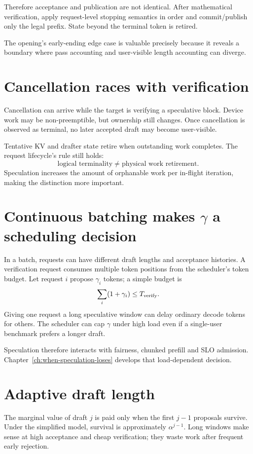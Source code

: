 Therefore acceptance and publication are not identical. After mathematical
verification, apply request-level stopping semantics in order and commit/publish only
the legal prefix. State beyond the terminal token is retired.

The opening's early-ending edge case is valuable precisely because it reveals a
boundary where pass accounting and user-visible length accounting can diverge.

\section{Cancellation races with verification}

Cancellation can arrive while the target is verifying a speculative block. Device
work may be non-preemptible, but ownership still changes. Once cancellation is
observed as terminal, no later accepted draft may become user-visible.

Tentative KV and drafter state retire when outstanding work completes. The request
lifecycle's rule still holds:
\[
\text{logical terminality}\ne\text{physical work retirement}.
\]
Speculation increases the amount of orphanable work per in-flight iteration, making
the distinction more important.

\section{Continuous batching makes $\gamma$ a scheduling decision}

In a batch, requests can have different draft lengths and acceptance histories. A
verification request consumes multiple token positions from the scheduler's token
budget. Let request $i$ propose $\gamma_i$ tokens; a simple budget is
\[
\sum_i (1+\gamma_i)\le T_{\rm verify}.
\]
Giving one request a long speculative window can delay ordinary decode tokens for
others. The scheduler can cap $\gamma$ under high load even if a single-user benchmark
prefers a longer draft.

Speculation therefore interacts with fairness, chunked prefill and SLO admission.
Chapter~\ref{ch:when-speculation-loses} develops that load-dependent decision.

\section{Adaptive draft length}

The marginal value of draft $j$ is paid only when the first $j-1$ proposals survive.
Under the simplified model, survival is approximately $\alpha^{j-1}$. Long windows
make sense at high acceptance and cheap verification; they waste work after frequent
early rejection.


